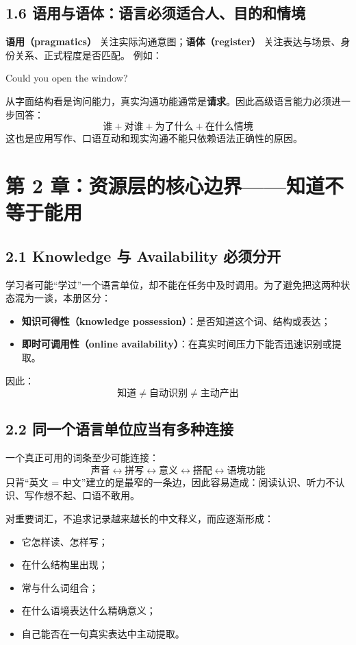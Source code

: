\documentclass[11pt,a4paper]{ctexart}
\newcommand{\kw}[1]{\textbf{#1}}
\newcommand{\term}[2]{\textbf{#1（#2）}}
\begin{document}
\subsection{1.6 语用与语体：语言必须适合人、目的和情境}
\term{语用}{pragmatics} 关注实际沟通意图；\term{语体}{register} 关注表达与场景、身份关系、正式程度是否匹配。
例如：
\begin{eng}
Could you open the window?
\end{eng}
从字面结构看是询问能力，真实沟通功能通常是\kw{请求}。因此高级语言能力必须进一步回答：
\[
\boxed{
\text{谁}
+\text{对谁}
+\text{为了什么}
+\text{在什么情境}
}
\]
这也是应用写作、口语互动和现实沟通不能只依赖语法正确性的原因。

\newpage
\section{第 2 章：资源层的核心边界——知道不等于能用}

\subsection{2.1 Knowledge 与 Availability 必须分开}
学习者可能“学过”一个语言单位，却不能在任务中及时调用。为了避免把这两种状态混为一谈，本册区分：
\begin{itemize}
  \item \term{知识可得性}{knowledge possession}：是否知道这个词、结构或表达；
  \item \term{即时可调用性}{online availability}：在真实时间压力下能否迅速识别或提取。
\end{itemize}
因此：
\[
\boxed{\text{知道}\neq\text{自动识别}\neq\text{主动产出}}
\]

\subsection{2.2 同一个语言单位应当有多种连接}
一个真正可用的词条至少可能连接：
\[
\boxed{
\text{声音}
\leftrightarrow
\text{拼写}
\leftrightarrow
\text{意义}
\leftrightarrow
\text{搭配}
\leftrightarrow
\text{语境功能}
}
\]
只背“英文 = 中文”建立的是最窄的一条边，因此容易造成：阅读认识、听力不认识、写作想不起、口语不敢用。

\begin{method}[词汇学习的正确产物]
对重要词汇，不追求记录越来越长的中文释义，而应逐渐形成：
\begin{itemize}
  \item 它怎样读、怎样写；
  \item 在什么结构里出现；
  \item 常与什么词组合；
  \item 在什么语境表达什么精确意义；
  \item 自己能否在一句真实表达中主动提取。
\end{itemize}
\end{method}
\end{document}
